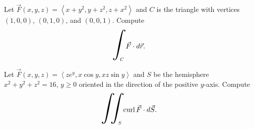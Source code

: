 \documentclass[20pt,a4paper]{extarticle}
\newcommand{\curl}{\mathrm{curl} \,}
\newcommand{\hint}[1]{\scalebox{2}{$\displaystyle\int_{\scalebox{0.35}{$#1$}}$}\,}
\newcommand{\hiint}[1]{\scalebox{2}{$\displaystyle\iint_{\scalebox{0.35}{$#1$}}$}\,}
\newcounter{example}[section]
\begin{document}
\newpage

\begin{example}
Let $\vec{F} (x, y, z) = \left\langle x+ y^2 , y + z^2 , z + x^2 \right\rangle$ and $C$ is the triangle with vertices $(1, 0, 0)$, $(0, 1, 0)$, and $(0, 0, 1)$. Compute
	\[
		\hint{C} \vec{F} \cdot d\vec{r} .
	\]
\end{example}
\begin{notes}

\end{notes}

\newpage 

\phantom{2} 

\newpage 

\begin{example}
Let $\vec{F} (x, y, z ) = \left\langle ze^y , x\cos y , xz \sin y \right\rangle$ and $S$ be the hemisphere $x^2 + y^2 + z^2 = 16$, $y \geq 0$ oriented in the direction of the positive $y$-axis. Compute 
	\[
		\hiint{S} \curl \vec{F} \cdot d \vec{S} .
	\]
\end{example}
\begin{notes}

\end{notes}

\newpage 

\phantom{2}
\end{document}
